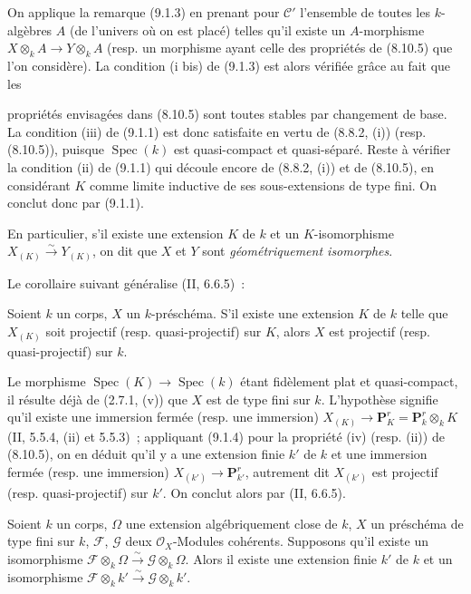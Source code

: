 On applique la remarque (9.1.3) en prenant pour $\mathcal C'$ l'ensemble de
toutes les $k$-algèbres $A$ (de l'univers où on est placé) telles qu'il existe
un $A$-morphisme $X\otimes_k A\to Y\otimes_k A$ (resp. un morphisme ayant
celle des propriétés de (8.10.5) que l'on considère). La condition (i bis) de
(9.1.3) est alors vérifiée grâce au fait que les

propriétés envisagées dans (8.10.5) sont toutes stables par changement de base.
La condition (iii) de (9.1.1) est donc satisfaite en vertu de (8.8.2, (i))
(resp. (8.10.5)), puisque $\operatorname{Spec}(k)$ est quasi-compact et
quasi-séparé. Reste à vérifier la condition (ii) de (9.1.1) qui découle encore
de (8.8.2, (i)) et de (8.10.5), en considérant $K$ comme limite inductive de
ses sous-extensions de type fini. On conclut donc par (9.1.1).

En particulier, s'il existe une extension $K$ de $k$ et un $K$-isomorphisme
$X_{(K)}\xrightarrow{\sim}Y_{(K)}$, on dit que $X$ et $Y$ sont
\emph{géométriquement isomorphes}.

Le corollaire suivant généralise (II, 6.6.5)~:

\begin{corollary}[9.1.5]
\label{IV.9.1.5-fr}
Soient $k$ un corps, $X$ un $k$-préschéma. S'il existe une extension $K$ de
$k$ telle que $X_{(K)}$ soit projectif (resp. quasi-projectif) sur $K$, alors
$X$ est projectif (resp. quasi-projectif) sur $k$.
\end{corollary}

Le morphisme $\operatorname{Spec}(K)\to\operatorname{Spec}(k)$ étant
fidèlement plat et quasi-compact, il résulte déjà de (2.7.1, (v)) que $X$ est
de type fini sur $k$. L'hypothèse signifie qu'il existe une immersion fermée
(resp. une immersion) $X_{(K)}\to\mathbf P_K^r=\mathbf P_k^r\otimes_k K$
(II, 5.5.4, (ii) et 5.5.3)~; appliquant (9.1.4) pour la propriété (iv)
(resp. (ii)) de (8.10.5), on en déduit qu'il y a une extension finie $k'$ de
$k$ et une immersion fermée (resp. une immersion)
$X_{(k')}\to\mathbf P_{k'}^r$, autrement dit $X_{(k')}$ est projectif
(resp. quasi-projectif) sur $k'$. On conclut alors par (II, 6.6.5).

\begin{proposition}[9.1.6]
\label{IV.9.1.6-fr}
Soient $k$ un corps, $\Omega$ une extension algébriquement close de $k$,
$X$ un préschéma de type fini sur $k$, $\mathcal F$, $\mathcal G$ deux
$\mathcal O_X$-Modules cohérents. Supposons qu'il existe un isomorphisme
$\mathcal F\otimes_k\Omega\xrightarrow{\sim}\mathcal G\otimes_k\Omega$.
Alors il existe une extension finie $k'$ de $k$ et un isomorphisme
$\mathcal F\otimes_k k'\xrightarrow{\sim}\mathcal G\otimes_k k'$.
\end{proposition}

